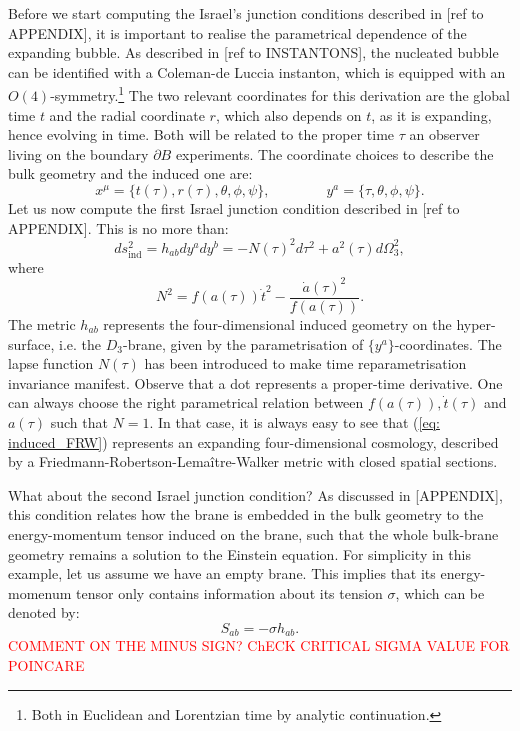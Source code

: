 \documentclass[12pt, a4paper]{article} %
\begin{document}
Before we start computing the Israel's junction conditions described in [ref to APPENDIX], it is important to realise the parametrical dependence of the expanding bubble. As described in [ref to INSTANTONS], the nucleated bubble can be identified with a Coleman-de Luccia instanton, which is equipped with an $O(4)$-symmetry.\footnote{Both in Euclidean and Lorentzian time by analytic continuation.} The two relevant coordinates for this derivation are the global time $t$ and the radial coordinate $r$, which also depends on $t$, as it is expanding, hence evolving in time. Both will be related to the proper time $\tau$ an observer living on the boundary $\partial B$ experiments. The coordinate choices to describe the bulk geometry and the induced one are:
\begin{equation}\label{eq: coordinates}
	x^{\mu} = \{t(\tau), r(\tau), \theta, \phi, \psi \}, \qquad \qquad  y^{a} = \{\tau, \theta, \phi, \psi\}.
\end{equation}
Let us now compute the first Israel junction condition described in [ref to APPENDIX]. This is no more than:
\begin{equation}\label{eq: induced_FRW}
	ds^{2}_{\text{ind}} = h_{ab} dy^{a} dy^{b} =  -N(\tau)^{2}d\tau^{2} + a^{2}(\tau) d\Omega_{3}^{2},
\end{equation}
where
\begin{equation}\label{eq: lapse_func}
	N^{2} = f(a(\tau)) \dot{t}^{2} - \frac{\dot{a}(\tau)^{2}}{f(a(\tau))}.
\end{equation}
The metric $h_{ab}$ represents the four-dimensional induced geometry on the hyper-surface, i.e. the $D_{3}$-brane, given by the parametrisation of $\{y^{a}\}$-coordinates. The lapse function $N(\tau)$ has been introduced to make time reparametrisation invariance manifest. Observe that a dot represents a proper-time derivative. One can always choose the right parametrical relation between $f(a(\tau)), \dot{t}(\tau)$ and $a(\tau)$ such that $N=1$. In that case, it is always easy to see that (\ref{eq: induced_FRW}) represents an expanding four-dimensional cosmology, described by a Friedmann-Robertson-Lemaître-Walker metric with closed spatial sections. 

What about the second Israel junction condition? As discussed in [APPENDIX], this condition relates how the brane is embedded in the bulk geometry to the energy-momentum tensor induced on the brane, such that the whole bulk-brane geometry remains a solution to the Einstein equation. For simplicity in this example, let us assume we have an empty brane. This implies that its energy-momenum tensor only contains information about its tension $\sigma$, which can be denoted by:
\begin{equation}
	S_{ab} = - \sigma h_{ab}.
\end{equation}
\textcolor{red}{COMMENT ON THE MINUS SIGN? ChECK CRITICAL SIGMA VALUE FOR POINCARE}
\end{document}
